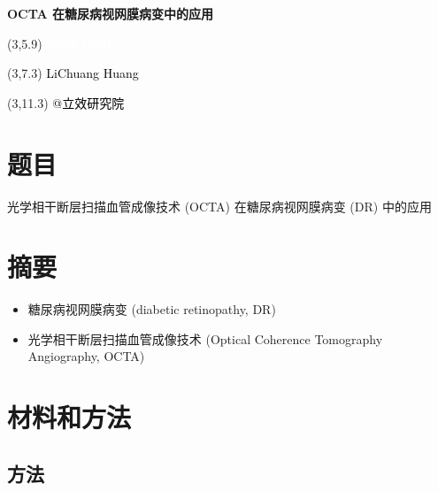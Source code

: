 \documentclass[
]{article}
\author{}
\date{\vspace{-2.5em}}
\providecommand{\tightlist}{%
  \setlength{\itemsep}{0pt}\setlength{\parskip}{0pt}}
\begin{document}
\begin{titlepage} 
\begin{center} \textbf{\Huge OCTA
在糖尿病视网膜病变中的应用} \vspace{4em}
\begin{textblock}{10}(3,5.9) \huge
\textbf{\textcolor{white}{2023-12-01}}
\end{textblock} \begin{textblock}{10}(3,7.3)
\Large \textcolor{black}{LiChuang Huang}
\end{textblock} \begin{textblock}{10}(3,11.3)
\Large \textcolor{black}{@立效研究院}
\end{textblock} \end{center} \end{titlepage}
\restoregeometry


\tableofcontents

\listoffigures

\listoftables

\newpage


\hypertarget{ux9898ux76ee}{%
\section{题目}\label{ux9898ux76ee}}

光学相干断层扫描血管成像技术 (OCTA) 在糖尿病视网膜病变 (DR) 中的应用

\hypertarget{abstract}{%
\section{摘要}\label{abstract}}

\begin{itemize}
\tightlist
\item
  糖尿病视网膜病变 (diabetic retinopathy, DR)
\item
  光学相干断层扫描血管成像技术 (Optical Coherence Tomography Angiography, OCTA)
\end{itemize}

\hypertarget{methods}{%
\section{材料和方法}\label{methods}}

\hypertarget{meth}{%
\subsection{方法}\label{meth}}
\end{document}
